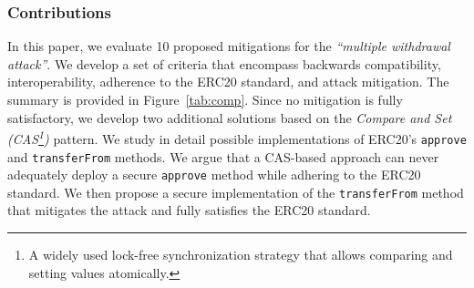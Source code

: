 \subsubsection*{Contributions} In this paper, we evaluate 10 proposed mitigations for the \textit{``multiple withdrawal attack''}. We develop a set of criteria that encompass backwards compatibility, interoperability, adherence to the ERC20 standard, and attack mitigation. The summary is provided in Figure~\ref{tab:comp}. Since no mitigation is fully satisfactory, we develop two additional solutions based on the \textit{Compare and Set (CAS\footnote{A widely used lock-free synchronization strategy that allows comparing and setting values atomically.})} pattern\cite{Ref06}. We study in detail possible implementations of ERC20's \texttt{approve} and \texttt{transferFrom} methods. We argue that a CAS-based approach can never adequately deploy a secure \texttt{approve} method while adhering to the ERC20 standard. We then propose a secure implementation of the \texttt{transferFrom} method that mitigates the attack and fully satisfies the ERC20 standard. 
